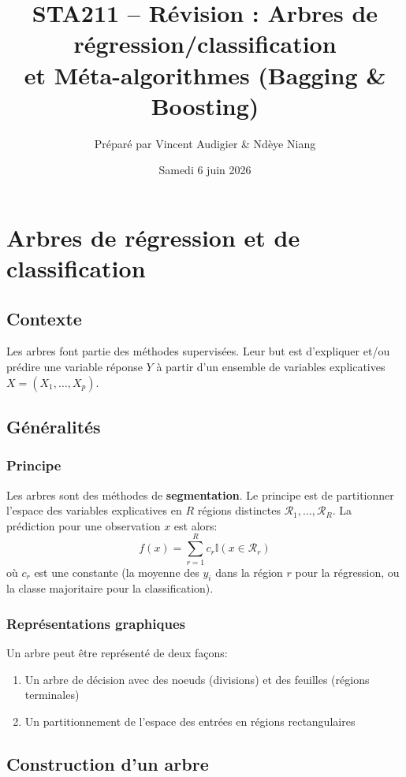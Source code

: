 \documentclass[a4paper,12pt]{article}
\title{STA211 -- Révision : Arbres de régression/classification \\ et Méta-algorithmes (Bagging \& Boosting)}
\author{Préparé par Vincent Audigier \& Ndèye Niang}
\date{Samedi 6 juin 2026}
\begin{document}
\maketitle
\tableofcontents
\newpage

\section{Arbres de régression et de classification}

\subsection{Contexte}
Les arbres font partie des méthodes supervisées. Leur but est d'expliquer et/ou prédire une variable réponse $Y$ à partir d'un ensemble de variables explicatives $X = (X_1, \ldots, X_p)$.

\subsection{Généralités}

\subsubsection{Principe}
Les arbres sont des méthodes de \textbf{segmentation}. Le principe est de partitionner l'espace des variables explicatives en $R$ régions distinctes $\mathcal{R}_1, \ldots, \mathcal{R}_R$. La prédiction pour une observation $x$ est alors:
\[
f(x) = \sum_{r=1}^{R} c_r \mathbb{I}(x \in \mathcal{R}_r)
\]
où $c_r$ est une constante (la moyenne des $y_i$ dans la région $r$ pour la régression, ou la classe majoritaire pour la classification).

\subsubsection{Représentations graphiques}
Un arbre peut être représenté de deux façons:
\begin{enumerate}
  \item Un arbre de décision avec des noeuds (divisions) et des feuilles (régions terminales)
  \item Un partitionnement de l'espace des entrées en régions rectangulaires
\end{enumerate}

\subsection{Construction d'un arbre}
\end{document}
